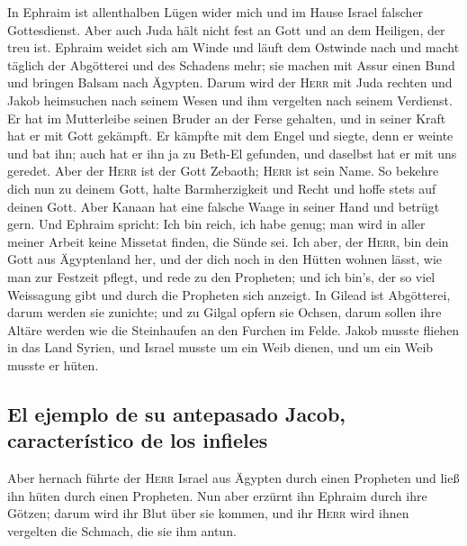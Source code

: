  In Ephraim ist allenthalben Lügen wider mich und im Hause
Israel falscher Gottesdienst. Aber auch Juda hält nicht fest an Gott und
an dem Heiligen, der treu ist.  Ephraim weidet sich am
Winde und läuft dem Ostwinde nach und macht täglich der Abgötterei und
des Schadens mehr; sie machen mit Assur einen Bund und bringen Balsam
nach Ägypten.  Darum wird der \textsc{Herr} mit Juda
rechten und Jakob heimsuchen nach seinem Wesen und ihm vergelten nach
seinem Verdienst.  Er hat im Mutterleibe seinen Bruder an
der Ferse gehalten, und in seiner Kraft hat er mit Gott gekämpft.
 Er kämpfte mit dem Engel und siegte, denn er weinte und
bat ihn; auch hat er ihn ja zu Beth-El gefunden, und daselbst hat er mit
uns geredet.  Aber der \textsc{Herr} ist der Gott Zebaoth;
\textsc{Herr} ist sein Name.  So bekehre dich nun zu
deinem Gott, halte Barmherzigkeit und Recht und hoffe stets auf deinen
Gott.  Aber Kanaan hat eine falsche Waage in seiner Hand
und betrügt gern.  Und Ephraim spricht: Ich bin reich, ich
habe genug; man wird in aller meiner Arbeit keine Missetat finden, die
Sünde sei.  Ich aber, der \textsc{Herr}, bin dein Gott
aus Ägyptenland her, und der dich noch in den Hütten wohnen lässt, wie
man zur Festzeit pflegt,  und rede zu den Propheten; und
ich bin's, der so viel Weissagung gibt und durch die Propheten sich
anzeigt.  In Gilead ist Abgötterei, darum werden sie
zunichte; und zu Gilgal opfern sie Ochsen, darum sollen ihre Altäre
werden wie die Steinhaufen an den Furchen im Felde. 
Jakob musste fliehen in das Land Syrien, und Israel musste um ein Weib
dienen, und um ein Weib musste er hüten.

\hypertarget{el-ejemplo-de-su-antepasado-jacob-caracteruxedstico-de-los-infieles}{%
\subsection{El ejemplo de su antepasado Jacob, característico de los
infieles}\label{el-ejemplo-de-su-antepasado-jacob-caracteruxedstico-de-los-infieles}}

 Aber hernach führte der \textsc{Herr} Israel aus Ägypten
durch einen Propheten und ließ ihn hüten durch einen Propheten.
 Nun aber erzürnt ihn Ephraim durch ihre Götzen; darum
wird ihr Blut über sie kommen, und ihr \textsc{Herr} wird ihnen
vergelten die Schmach, die sie ihm antun.

